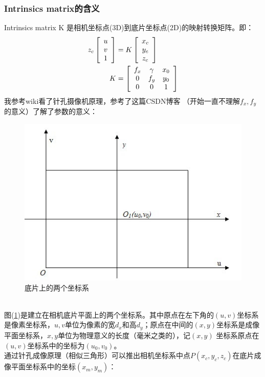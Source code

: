 \documentclass[UTF8]{ctexart}
\begin{document}
\subsubsection{Intrinsics matrix的含义}
Intrinsics matrix K 是相机坐标点(3D)到底片坐标点(2D)的映射转换矩阵。即：
\begin{align}
 z_c \left[ \begin{array}{c}  u \\ v \\ 1 \end{array} \right] &=
 K \left[ \begin{array}{c}   x_c \\  y_c \\  z_c  \end{array}\right]\\
K &= \left [ \begin{array}{ c c c}
f_x & \gamma   & x_0 \\
0  & f_y & y_0 \\
0  & 0   & 1 \\
\end{array} \right ]
\end{align}
我参考wiki\cite{Pinholecameramodel18830}看了针孔摄像机原理，参考了这篇CSDN博客\cite{CSDNJessicajiel18830} （开始一直不理解$f_x,f_y$的意义）了解了参数的意义：
\begin{figure}[htp]%
	\centering  %
	\includegraphics[width=0.5\linewidth]{./figures/twocor.jpg} %
	\caption{底片上的两个坐标系}  %
	\label{fig:twocor}   %
\end{figure}\\
图(\ref{fig:twocor})是建立在相机底片平面上的两个坐标系。其中原点在左下角的$(u,v)$坐标系是像素坐标系，$u,v$单位为像素的宽$d_x$和高$d_y$；原点在中间的$(x,y)$坐标系是成像平面坐标系，$x,y$单位为物理意义的长度（毫米之类的），记$(x,y)$ 坐标系原点在$(u,v)$坐标系中的坐标为$(u_0,v_0)$。\\
通过\cite{Pinholecameramodel18830}针孔成像原理（相似三角形）可以推出相机坐标系中点$P(x_c,y_c,z_c)$在底片成像平面坐标系中的坐标$(x_m,y_m)$：
\end{document}
